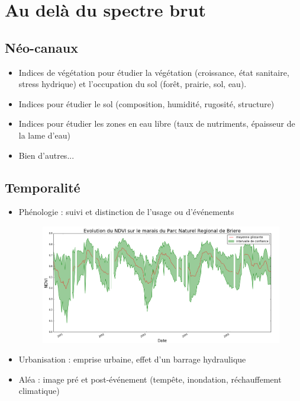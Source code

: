 \documentclass[11pt]{beamer}
\begin{document}
\section{Au delà du spectre brut}
\subsection{Néo-canaux}
\begin{frame}{}
\begin{itemize}
\item Indices de végétation pour étudier la végétation (croissance, état sanitaire, stress hydrique) et l'occupation du sol (forêt, prairie, sol, eau).
\item Indices pour étudier le sol (composition, humidité, rugosité, structure)
\item Indices pour étudier les zones en eau libre (taux de nutriments, épaisseur de la lame d'eau)
\item Bien d'autres...
\end{itemize}
\end{frame}

\subsection{Temporalité}
\begin{frame}{}
\begin{itemize}

\item Phénologie : suivi et distinction de l'usage ou d’événements
\begin{figure}[!h]
\centering
\includegraphics[scale=0.17]{img/NDVI_Briere.png}
\end{figure}
\item Urbanisation : emprise urbaine, effet d'un barrage hydraulique
\item Aléa : image pré et post-événement (tempête, inondation, réchauffement climatique)
\end{itemize}
\end{frame}
\end{document}
